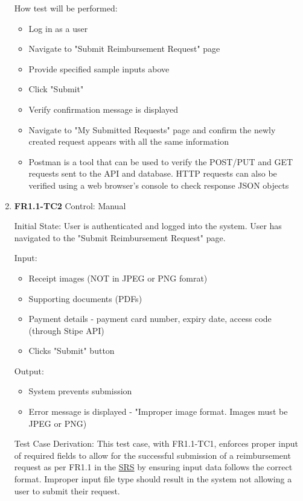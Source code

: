 \documentclass[12pt, titlepage]{article}
\begin{document}
\begin{enumerate}
How test will be performed:
\begin{itemize}
    \item Log in as a user
    \item Navigate to "Submit Reimbursement Request" page
    \item Provide specified sample inputs above
    \item Click "Submit"
    \item Verify confirmation message is displayed
    \item Navigate to "My Submitted Requests" page and confirm the newly created request appears with all the same information
    \item Postman is a tool that can be used to verify the POST/PUT and GET requests sent to the API and database. HTTP requests can also be verified using a web browser's console to check response JSON objects
\end{itemize}
					
\item{\textbf{FR1.1-TC2}}
\hypertarget{FR1.1-TC2}{}
Control: Manual
					
Initial State: User is authenticated and logged into the system. User has navigated to the "Submit Reimbursement Request" page.
					
Input: 
\begin{itemize}
    \item Receipt images (NOT in JPEG or PNG fomrat)
    \item Supporting documents (PDFs)
    \item Payment details - payment card number, expiry date, access code (through Stipe API)
    \item Clicks "Submit" button
\end{itemize}
					
Output: 
\begin{itemize}
    \item System prevents submission
    \item Error message is displayed - "Improper image format. Images must be JPEG or PNG)
\end{itemize}

Test Case Derivation: This test case, with FR1.1-TC1, enforces proper input of required fields to allow for the successful submission of a reimbursement request as per FR1.1 in the \href{https://shorturl.at/FdAgR}{SRS} by ensuring input data follows the correct format. Improper input file type should result in the system not allowing a user to submit their request.


\end{enumerate}
\end{document}
